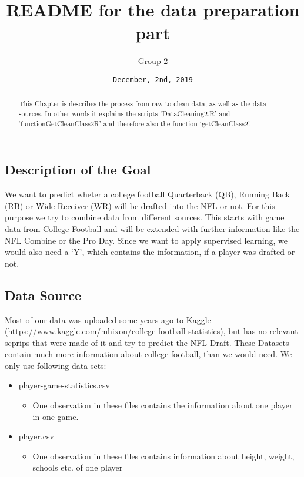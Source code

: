 \documentclass[]{article}
\title{README for the data preparation part}
\author{Group 2}
\date{\texttt{December,\ 2nd,\ 2019}}
\providecommand{\tightlist}{%
  \setlength{\itemsep}{0pt}\setlength{\parskip}{0pt}}
\begin{document}
\maketitle
\begin{abstract}
This Chapter is describes the process from raw to clean data, as well as
the data sources. In other words it explains the scripts
`DataCleaning2.R' and `functionGetCleanClass2R' and therefore also the
function `getCleanClass2'.
\end{abstract}

\hypertarget{description-of-the-goal}{%
\subsection{Description of the Goal}\label{description-of-the-goal}}

We want to predict wheter a college football Quarterback (QB), Running
Back (RB) or Wide Receiver (WR) will be drafted into the NFL or not. For
this purpose we try to combine data from different sources. This starts
with game data from College Football and will be extended with further
information like the NFL Combine or the Pro Day. Since we want to apply
supervised learning, we would also need a `Y', which contains the
information, if a player was drafted or not.

\hypertarget{data-source}{%
\subsection{Data Source}\label{data-source}}

Most of our data was uploaded some years ago to Kaggle
(\url{https://www.kaggle.com/mhixon/college-football-statistics}), but
has no relevant scprips that were made of it and try to predict the NFL
Draft. These Datasets contain much more information about college
football, than we would need. We only use following data sets:

\begin{itemize}
\tightlist
\item
  player-game-statistics.csv

  \begin{itemize}
  \tightlist
  \item
    One observation in these files contains the information about one
    player in one game.
  \end{itemize}
\item
  player.csv

  \begin{itemize}
  \tightlist
  \item
    One observation in these files contains information about height,
    weight, schools etc. of one player
  \end{itemize}
\end{itemize}
\end{document}

